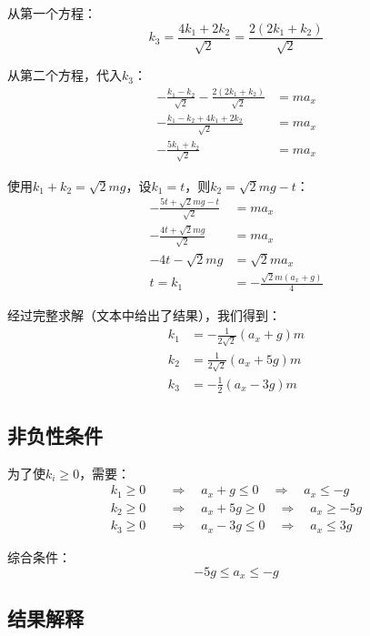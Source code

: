 \documentclass[12pt,a4paper]{article}
\begin{document}
从第一个方程：
\begin{equation}
k_3 = \frac{4k_1 + 2k_2}{\sqrt{2}} = \frac{2(2k_1 + k_2)}{\sqrt{2}}
\end{equation}

从第二个方程，代入$k_3$：
\begin{align}
-\frac{k_1 - k_2}{\sqrt{2}} - \frac{2(2k_1 + k_2)}{\sqrt{2}} &= ma_x \\
-\frac{k_1 - k_2 + 4k_1 + 2k_2}{\sqrt{2}} &= ma_x \\
-\frac{5k_1 + k_2}{\sqrt{2}} &= ma_x
\end{align}

使用$k_1 + k_2 = \sqrt{2}mg$，设$k_1 = t$，则$k_2 = \sqrt{2}mg - t$：
\begin{align}
-\frac{5t + \sqrt{2}mg - t}{\sqrt{2}} &= ma_x \\
-\frac{4t + \sqrt{2}mg}{\sqrt{2}} &= ma_x \\
-4t - \sqrt{2}mg &= \sqrt{2}ma_x \\
t = k_1 &= -\frac{\sqrt{2}m(a_x + g)}{4}
\end{align}

经过完整求解（文本中给出了结果），我们得到：
\begin{align}
k_1 &= -\frac{1}{2\sqrt{2}}(a_x + g)m \\
k_2 &= \frac{1}{2\sqrt{2}}(a_x + 5g)m \\
k_3 &= -\frac{1}{2}(a_x - 3g)m
\end{align}

\subsection{非负性条件}

为了使$k_i \geq 0$，需要：
\begin{align}
k_1 \geq 0 &\quad \Rightarrow \quad a_x + g \leq 0 \quad \Rightarrow \quad a_x \leq -g \\
k_2 \geq 0 &\quad \Rightarrow \quad a_x + 5g \geq 0 \quad \Rightarrow \quad a_x \geq -5g \\
k_3 \geq 0 &\quad \Rightarrow \quad a_x - 3g \leq 0 \quad \Rightarrow \quad a_x \leq 3g
\end{align}

综合条件：
\begin{equation}
-5g \leq a_x \leq -g
\end{equation}

\subsection{结果解释}
\end{document}
